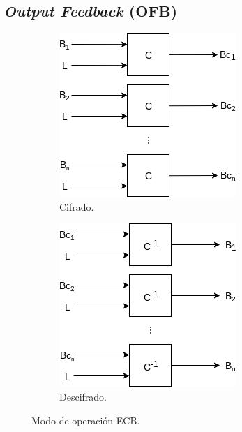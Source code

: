 \subsection{\textit{Output Feedback} (OFB)}

\begin{figure}[H]
  \centering
  \begin{subfigure}{0.45\textwidth}
      \begin{center}
          \includegraphics[width=0.7\linewidth]
            {contenidos/antecedentes/diagramas/modo_ecb.png}
          \caption{Cifrado.}
      \end{center}
  \end{subfigure}
  \begin{subfigure}{0.45\textwidth}
      \begin{center}
          \includegraphics[width=0.7\linewidth]
            {contenidos/antecedentes/diagramas/modo_ecb_inverso.png}
          \caption{Descifrado.}
      \end{center}
  \end{subfigure}
  \caption{Modo de operación ECB.}
\end{figure}
